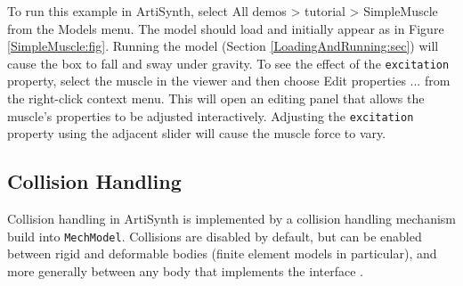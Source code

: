 To run this example in ArtiSynth, select {\sf All demos > tutorial >
SimpleMuscle} from the {\sf Models} menu. The model should load and
initially appear as in Figure \ref{SimpleMuscle:fig}.  Running the
model (Section \ref{LoadingAndRunning:sec}) will cause the box to fall
and sway under gravity. To see the effect of the {\tt excitation}
property, select the muscle in the viewer and then choose {\sf Edit
properties ...} from the right-click context menu.  This will open an
editing panel that allows the muscle's properties to be adjusted
interactively. Adjusting the {\tt excitation} property using the
adjacent slider will cause the muscle force to vary.






\subsection{Collision Handling}
\label{sec:mechii:collisions}

Collision handling in ArtiSynth is implemented by a collision
handling mechanism build into {\tt MechModel}. Collisions are
disabled by default, but can be enabled between rigid and deformable
bodies (finite element models in particular), and more generally
between any body that implements the interface 
.

